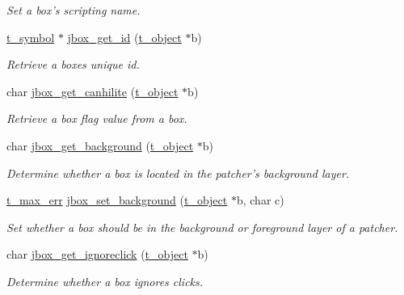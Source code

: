 \begin{DoxyCompactItemize}
\begin{DoxyCompactList}\small\item\em Set a box's scripting name. \item\end{DoxyCompactList}\item 
\hyperlink{structt__symbol}{t\_\-symbol} $\ast$ \hyperlink{group__jbox_ga0b2499248b44f3f138407129f39f274e}{jbox\_\-get\_\-id} (\hyperlink{structt__object}{t\_\-object} $\ast$b)
\begin{DoxyCompactList}\small\item\em Retrieve a boxes unique id. \item\end{DoxyCompactList}\item 
char \hyperlink{group__jbox_ga57ff4e001cd4725d3cb7afb5a5dd4b56}{jbox\_\-get\_\-canhilite} (\hyperlink{structt__object}{t\_\-object} $\ast$b)
\begin{DoxyCompactList}\small\item\em Retrieve a box flag value from a box. \item\end{DoxyCompactList}\item 
char \hyperlink{group__jbox_ga453e949f39ffe6a95063a8d554e25adf}{jbox\_\-get\_\-background} (\hyperlink{structt__object}{t\_\-object} $\ast$b)
\begin{DoxyCompactList}\small\item\em Determine whether a box is located in the patcher's background layer. \item\end{DoxyCompactList}\item 
\hyperlink{group__datatypes_ga73edaae82b318855cc09fac994918165}{t\_\-max\_\-err} \hyperlink{group__jbox_gabcff56f0530497761daf30b021378308}{jbox\_\-set\_\-background} (\hyperlink{structt__object}{t\_\-object} $\ast$b, char c)
\begin{DoxyCompactList}\small\item\em Set whether a box should be in the background or foreground layer of a patcher. \item\end{DoxyCompactList}\item 
char \hyperlink{group__jbox_gaa84d6ce8c5dbd9fc69acc603b69a5fb0}{jbox\_\-get\_\-ignoreclick} (\hyperlink{structt__object}{t\_\-object} $\ast$b)
\begin{DoxyCompactList}\small\item\em Determine whether a box ignores clicks. \item\end{DoxyCompactList}\item 

\end{DoxyCompactItemize}
